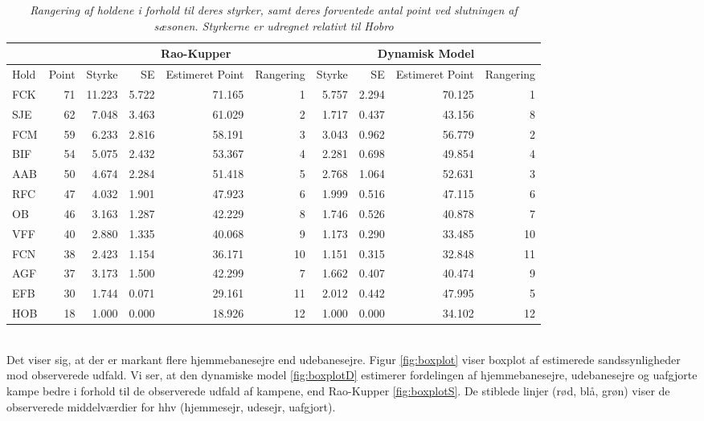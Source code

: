 \documentclass[11pt,a4paper]{article}
\begin{document}
\begin{table}[htb!]
\centering
\begin{adjustbox}{max width=\textwidth}
\begin{tabular}{|lr|rrrr|rrrr|}
\hline
\multicolumn{2}{|c|}{} & \multicolumn{4}{c|}{Rao-Kupper} & \multicolumn{4}{c|}{Dynamisk Model} \\
\hline
Hold & Point & Styrke & SE & Estimeret Point & Rangering & Styrke & SE & Estimeret Point & Rangering \\
  \hline
    FCK & 71 & 11.223 & 5.722 & 71.165 & 1  & 5.757 & 2.294 & 70.125 & 1 \\
    SJE & 62 & 7.048  & 3.463 & 61.029 & 2  & 1.717 & 0.437 & 43.156 & 8 \\
    FCM & 59 & 6.233  & 2.816 & 58.191 & 3  & 3.043 & 0.962 & 56.779 & 2 \\
    BIF & 54 & 5.075  & 2.432 & 53.367 & 4  & 2.281 & 0.698 & 49.854 & 4 \\
    AAB & 50 & 4.674  & 2.284 & 51.418 & 5  & 2.768 & 1.064 & 52.631 & 3 \\
    RFC & 47 & 4.032  & 1.901 & 47.923 & 6  & 1.999 & 0.516 & 47.115 & 6 \\
    OB  & 46 & 3.163  & 1.287 & 42.229 & 8  & 1.746 & 0.526 & 40.878 & 7 \\
    VFF & 40 & 2.880  & 1.335 & 40.068 & 9  & 1.173 & 0.290 & 33.485 & 10 \\
    FCN & 38 & 2.423  & 1.154 & 36.171 & 10 & 1.151 & 0.315 & 32.848 & 11 \\
    AGF & 37 & 3.173  & 1.500 & 42.299 & 7  & 1.662 & 0.407 & 40.474 & 9 \\
    EFB & 30 & 1.744  & 0.071 & 29.161 & 11 & 2.012 & 0.442 & 47.995 & 5 \\
    HOB & 18 & 1.000  & 0.000 & 18.926 & 12 & 1.000 & 0.000 & 34.102 & 12 \\
   \hline   
\end{tabular} 
\end{adjustbox}
\caption{\label{tab:Styrkeestimater}\textit{Rangering af holdene i forhold til deres styrker, samt deres forventede antal point ved slutningen af sæsonen. Styrkerne er udregnet relativt til Hobro}}
\end{table}
\\Det viser sig, at der er markant flere hjemmebanesejre end udebanesejre. Figur \ref{fig:boxplot} viser boxplot af estimerede sandssynligheder mod observerede udfald. Vi ser, at den dynamiske model \ref{fig:boxplotD} estimerer fordelingen af hjemmebanesejre, udebanesejre og uafgjorte kampe bedre i forhold til de observerede udfald af kampene, end Rao-Kupper \ref{fig:boxplotS}. De stiblede linjer (rød, blå, grøn) viser de observerede middelværdier for hhv (hjemmesejr, udesejr, uafgjort).
\end{document}
